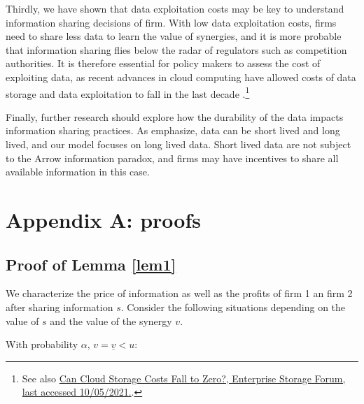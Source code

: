 \documentclass[a4paper,leqno]{article}%
\renewcommand{\a}{\alpha}
\newcommand{\uv}{\underline{v}}
\begin{document}
Thirdly, we have shown that data exploitation costs may be key to understand information sharing decisions of firm. With low data exploitation costs, firms need to share less data to learn the value of synergies, and it is more probable that information sharing flies below the radar of regulators such as competition authorities. It is therefore essential for policy makers to assess the cost of exploiting data, as recent advances in cloud computing have allowed costs of data storage and data exploitation to fall in the last decade \citep{lambrecht2015can}.\footnote{See also \href{https://www.enterprisestorageforum.com/management/can-cloud-storage-costs-fall-to-zero/}{Can Cloud Storage Costs Fall to Zero?, Enterprise Storage Forum, last accessed 10/05/2021.}.} 


Finally, further research should explore how the durability of the data impacts information sharing practices. As \cite{valavi2020time} emphasize, data can be short lived and long lived, and our model focuses on long lived data. Short lived data are not subject to the Arrow information paradox, and firms may have incentives to share all available information in this case. 



\singlespacing






\appendix


\section{Appendix A: proofs}

\subsection{Proof of Lemma \ref{lem1}}\label{lem1p}

We characterize the price of information as well as the profits of firm 1 an firm 2 after sharing information $s$. Consider the following situations depending on the value of $s$ and the value of the synergy $v$.

With probability $\a$, $v=\uv<u$:
\end{document}
